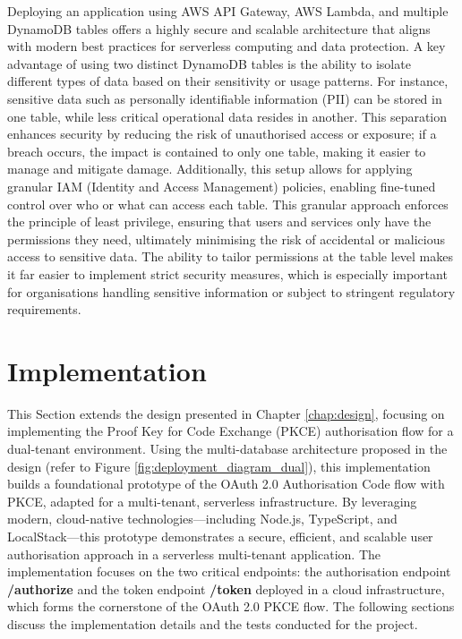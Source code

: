 Deploying an application using AWS API Gateway, AWS Lambda, and multiple DynamoDB tables offers a highly secure and scalable architecture that aligns with modern best practices for serverless computing and data protection. A key advantage of using two distinct DynamoDB tables is the ability to isolate different types of data based on their sensitivity or usage patterns. For instance, sensitive data such as personally identifiable information (PII) can be stored in one table, while less critical operational data resides in another. This separation enhances security by reducing the risk of unauthorised access or exposure; if a breach occurs, the impact is contained to only one table, making it easier to manage and mitigate damage. Additionally, this setup allows for applying granular IAM (Identity and Access Management) policies, enabling fine-tuned control over who or what can access each table. This granular approach enforces the principle of least privilege, ensuring that users and services only have the permissions they need, ultimately minimising the risk of accidental or malicious access to sensitive data. The ability to tailor permissions at the table level makes it far easier to implement strict security measures, which is especially important for organisations handling sensitive information or subject to stringent regulatory requirements.

\section{Implementation}
This Section extends the design presented in Chapter \ref{chap:design}, focusing on implementing the Proof Key for Code Exchange (PKCE) authorisation flow for a dual-tenant environment. Using the multi-database architecture proposed in the design (refer to Figure \ref{fig:deployment_diagram_dual}), this implementation builds a foundational prototype of the OAuth 2.0 Authorisation Code flow with PKCE, adapted for a multi-tenant, serverless infrastructure. By leveraging modern, cloud-native technologies—including Node.js, TypeScript, and LocalStack—this prototype demonstrates a secure, efficient, and scalable user authorisation approach in a serverless multi-tenant application. The implementation focuses on the two critical endpoints: the authorisation endpoint \textbf{/authorize} and the token endpoint \textbf{/token} deployed in a cloud infrastructure, which forms the cornerstone of the OAuth 2.0 PKCE flow. The following sections discuss the implementation details and the tests conducted for the project.


